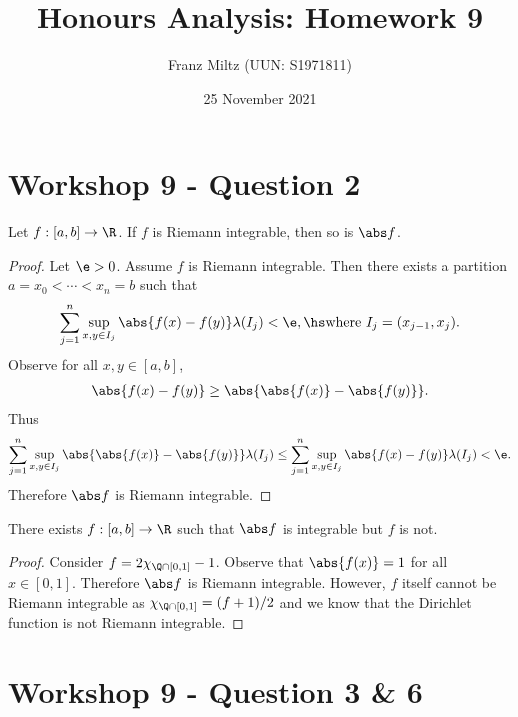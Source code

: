 \documentclass{article}
\begin{document}
\title{Honours Analysis: Homework 9}
\author{Franz Miltz (UUN: S1971811)}
\date{25 November 2021}
\maketitle

\section*{Workshop 9 - Question 2}

\begin{claim*}
	Let $f:[a,b]\to\R$. If $f$ is Riemann integrable, then so is $\abs f$.
\end{claim*}
\begin{proof}
	Let $\e>0$. Assume $f$ is Riemann integrable. Then there exists a partition
	$a=x_0<\cdots<x_n=b$ such that
	\begin{align*}
		\sum_{j=1}^n \sup_{x,y\in I_j} \abs{f(x) - f(y)} \lambda(I_j) < \e,\hs
		\text{where }I_j = (x_{j-1}, x_j).
	\end{align*}
	Observe for all $x,y\in[a,b]$,
	\begin{align*}
		\abs{f(x)-f(y)} \geq \abs{\abs{f(x)} - \abs{f(y)}}.
	\end{align*}
	Thus
	\begin{align*}
		\sum_{j=1}^n \sup_{x,y\in I_j} \abs{\abs{f(x)} - \abs{f(y)}} \lambda(I_j)
		\leq \sum_{j=1}^n \sup_{x,y\in I_j} \abs{f(x) - f(y)} \lambda(I_j) < \e.
	\end{align*}
	Therefore $\abs f$ is Riemann integrable.
\end{proof}

\begin{claim*}
	There exists $f:[a,b]\to\R$ such that $\abs f$ is integrable but $f$ is not.
\end{claim*}
\begin{proof}
	Consider $f = 2\chi_{\Q\cap[0,1]}-1$. Observe that $\abs{f(x)} = 1$ for all $x\in[0,1]$.
	Therefore $\abs f$ is Riemann integrable. However, $f$ itself cannot be Riemann integrable
	as $\chi_{\Q\cap[0,1]} = (f+1)/2$ and we know that the Dirichlet function is not Riemann
	integrable.
\end{proof}

\section*{Workshop 9 - Question 3 \& 6}
\end{document}

